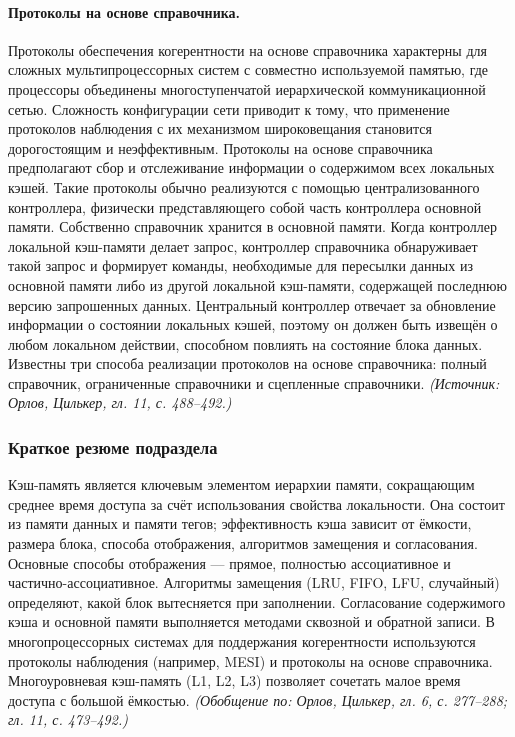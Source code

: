 \documentclass[a4paper,12pt]{article}
\begin{document}
\paragraph{Протоколы на основе справочника.}
Протоколы обеспечения когерентности на основе справочника характерны для сложных мультипроцессорных систем с совместно используемой памятью, где процессоры объединены многоступенчатой иерархической коммуникационной сетью. Сложность конфигурации сети приводит к тому, что применение протоколов наблюдения с их механизмом широковещания становится дорогостоящим и неэффективным. Протоколы на основе справочника предполагают сбор и отслеживание информации о содержимом всех локальных кэшей. Такие протоколы обычно реализуются с помощью централизованного контроллера, физически представляющего собой часть контроллера основной памяти. Собственно справочник хранится в основной памяти. Когда контроллер локальной кэш-памяти делает запрос, контроллер справочника обнаруживает такой запрос и формирует команды, необходимые для пересылки данных из основной памяти либо из другой локальной кэш-памяти, содержащей последнюю версию запрошенных данных. Центральный контроллер отвечает за обновление информации о состоянии локальных кэшей, поэтому он должен быть извещён о любом локальном действии, способном повлиять на состояние блока данных. Известны три способа реализации протоколов на основе справочника: полный справочник, ограниченные справочники и сцепленные справочники.
\textit{(Источник: Орлов, Цилькер, гл. 11, с. 488--492.)}

\subsubsection{Краткое резюме подраздела}
Кэш-память является ключевым элементом иерархии памяти, сокращающим среднее время доступа за счёт использования свойства локальности. Она состоит из памяти данных и памяти тегов; эффективность кэша зависит от ёмкости, размера блока, способа отображения, алгоритмов замещения и согласования. Основные способы отображения --- прямое, полностью ассоциативное и частично-ассоциативное. Алгоритмы замещения (LRU, FIFO, LFU, случайный) определяют, какой блок вытесняется при заполнении. Согласование содержимого кэша и основной памяти выполняется методами сквозной и обратной записи. В многопроцессорных системах для поддержания когерентности используются протоколы наблюдения (например, MESI) и протоколы на основе справочника. Многоуровневая кэш-память (L1, L2, L3) позволяет сочетать малое время доступа с большой ёмкостью.
\textit{(Обобщение по: Орлов, Цилькер, гл. 6, с. 277--288; гл. 11, с. 473--492.)}
\end{document}
